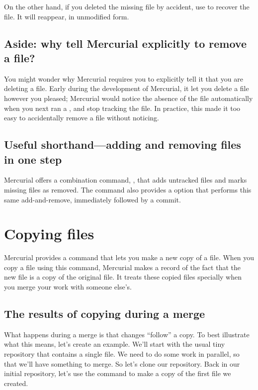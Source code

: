 On the other hand, if you deleted the missing file by accident, use
 to recover the file.  It will
reappear, in unmodified form.

\subsection{Aside: why tell Mercurial explicitly to 
  remove a file?}

You might wonder why Mercurial requires you to explicitly tell it that
you are deleting a file.  Early during the development of Mercurial,
it let you delete a file however you pleased; Mercurial would notice
the absence of the file automatically when you next ran a
, and stop tracking the file.  In practice, this made it
too easy to accidentally remove a file without noticing.

\subsection{Useful shorthand---adding and removing files
  in one step}

Mercurial offers a combination command, , that adds
untracked files and marks missing files as removed.  
The  command also provides a  option
that performs this same add-and-remove, immediately followed by a
commit.

\section{Copying files}

Mercurial provides a  command that lets you make a new
copy of a file.  When you copy a file using this command, Mercurial
makes a record of the fact that the new file is a copy of the original
file.  It treats these copied files specially when you merge your work
with someone else's.

\subsection{The results of copying during a merge}

What happens during a merge is that changes ``follow'' a copy.  To
best illustrate what this means, let's create an example.  We'll start
with the usual tiny repository that contains a single file.
We need to do some work in parallel, so that we'll have something to
merge.  So let's clone our repository.
Back in our initial repository, let's use the  command to
make a copy of the first file we created.

